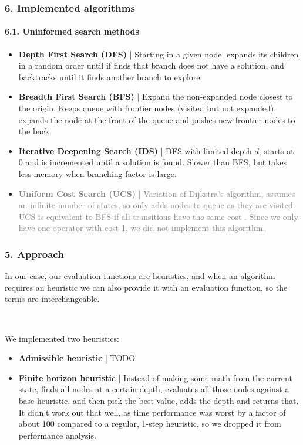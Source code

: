 \documentclass{beamer}
\begin{document}
\begin{frame}
\frametitle{6. Implemented algorithms}
\framesubtitle{6.1. Uninformed search methods}

\begin{itemize}
  \item \textbf{Depth First Search (DFS)} | Starting in a given node, expands its children in a random order until if finds that branch does not have a solution, and backtracks until it finds another branch to explore. 
  
  \item \textbf{Breadth First Search (BFS)} |  Expand the non-expanded node closest to the origin. Keeps queue with frontier nodes (visited but not expanded), expands the node at the front of the queue and pushes new frontier nodes to the back.
  
  \item \textbf{Iterative Deepening Search (IDS)} | DFS with limited depth $d$; starts at $0$ and is incremented until a solution is found. Slower than BFS, but takes less memory when branching factor is large.
  
  \item \textcolor{gray}{\textbf{Uniform Cost Search (UCS)} | Variation of Dijkstra's algorithm, assumes an infinite number of states, so only adds nodes to queue as they are visited.
  UCS is equivalent to BFS if all transitions have the same cost \cite{javatpoint-uninformed}.
  Since we only have one operator with cost 1, we did not implement this algorithm.}
\end{itemize}
\end{frame}

\begin{frame}
  \frametitle{5. Approach}
  
  In our case, our evaluation functions are heuristics, and when an algorithm requires an heuristic we can also provide it with an evaluation function, so the terms are interchangeable.

  ~

  We implemented two heuristics:
  \begin{itemize}
    \item \textbf{Admissible heuristic} | TODO
    \item \textbf{Finite horizon heuristic} | Instead of making some math from the current state, finds all nodes at a certain depth, evaluates all those nodes against a base heuristic, and then pick the best value, adds the depth and returns that.
    It didn't work out that well, as time performance was worst by a factor of about 100 compared to a regular, 1-step heuristic, so we dropped it from performance analysis.
  \end{itemize}
  \end{frame}
\end{document}
